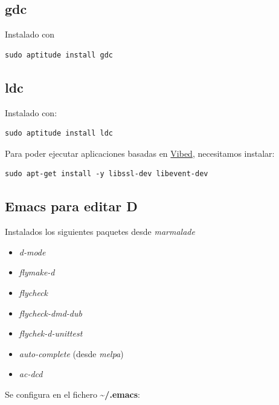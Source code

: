 \documentclass[12pt,spanish,]{article}
\providecommand{\tightlist}{%
  \setlength{\itemsep}{0pt}\setlength{\parskip}{0pt}}
\begin{document}
\subsection{gdc}\label{gdc}

Instalado con

\begin{verbatim}
sudo aptitude install gdc
\end{verbatim}

\subsection{ldc}\label{ldc}

Instalado con:

\begin{verbatim}
sudo aptitude install ldc
\end{verbatim}

Para poder ejecutar aplicaciones basadas en
\href{http://vibed.org/}{Vibed}, necesitamos instalar:

\begin{verbatim}
sudo apt-get install -y libssl-dev libevent-dev
\end{verbatim}

\subsection{Emacs para editar D}\label{emacs-para-editar-d}

Instalados los siguientes paquetes desde \emph{marmalade}

\begin{itemize}
\tightlist
\item
  \emph{d-mode}
\item
  \emph{flymake-d}
\item
  \emph{flycheck}
\item
  \emph{flycheck-dmd-dub}
\item
  \emph{flychek-d-unittest}
\item
  \emph{auto-complete} (desde \emph{melpa})
\item
  \emph{ac-dcd}
\end{itemize}

Se configura en el fichero \textbf{\textasciitilde{}/.emacs}:
\end{document}
